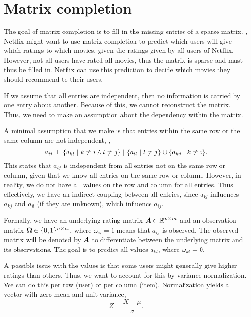 \section{Matrix completion}

The goal of matrix completion is to fill in the missing entries of a sparse matrix. \Eg, Netflix
might want to use matrix completion to predict which users will give which ratings to which movies,
given the ratings given by all users of Netflix. However, not all users have rated all movies, thus
the matrix is sparse and must thus be filled in. Netflix can use this prediction to decide which
movies they should recommend to their users.

If we assume that all entries are independent, then no information is carried by one entry about
another. Because of this, we cannot reconstruct the matrix. Thus, we need to make an assumption
about the dependency within the matrix.

\begin{important}
    A minimal assumption that we make is that entries
    within the same row or the same column are not independent, \ie, \[
        a_{ij} \mathrel{\perp\!\!\!\!\perp} \{ a_{kl} \mid k \neq i \land l \neq j \} \mid \{ a_{il} \mid l \neq j \} \cup \{ a_{kj} \mid k \neq i \}.
    \]
    This states that $a_{ij}$ is independent from all entries not on the same row or column, given that
    we know all entries on the same row or column. However, in reality, we do not have all values on
    the row and column for all entries. Thus, effectively, we have an indirect coupling between all
    entries, since $a_{kl}$ influences $a_{kj}$ and $a_{il}$ (if they are unknown), which influence
    $a_{ij}$.
\end{important}

Formally, we have an underlying rating matrix $\bm{A} \in \mathbb{R}^{n \times m}$ and an observation
matrix $\bm{\Omega} \in \{ 0,1 \}^{n\times m}$, where $\omega_{ij}=1$ means that $a_{ij}$ is
observed. The observed matrix will be denoted by $\tilde{\bm{A}}$ to differentiate between the
underlying matrix and its observations. The goal is to predict all values $a_{kl}$, where
$\omega_{kl}=0$.

A possible issue with the values is that some users might generally give higher ratings than
others. Thus, we want to account for this by variance normalization. We can do this per row (user)
or per column (item).
Normalization yields a vector with zero mean and unit variance, \[
    Z = \frac{X - \mu}{\sigma}.
\]

